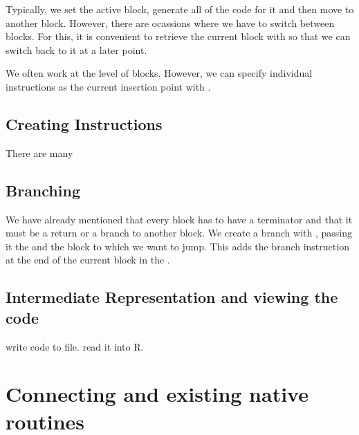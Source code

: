 \documentclass[article]{jss}
\begin{document}
Typically, we set the active block, generate all of the code for it
and then move to another block.  However, there are ocassions where we
have to switch between blocks. For this, it is convenient to retrieve
the current block with  so that we can switch
back to it at a later point.

We often work at the level of blocks. However, we can specify
individual instructions as the current insertion point
with .%





\subsection{Creating Instructions}
There are many 


\subsection{Branching}
We have already mentioned that every block has to have a terminator
and that it must be a return or a branch to another block.  We create
a branch with , passing it the 
and the block to which we want to jump. This adds the branch
instruction at the end of the current block in the .


\subsection{Intermediate Representation and viewing the code}


write code to file.
read it into R.





\section[Connecting LLVM and existing native routines]{Connecting \llvm{} and existing native routines}
\end{document}
